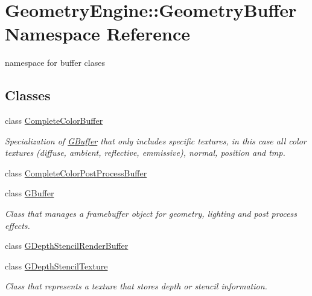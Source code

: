 \hypertarget{namespace_geometry_engine_1_1_geometry_buffer}{}\section{Geometry\+Engine\+::Geometry\+Buffer Namespace Reference}
\label{namespace_geometry_engine_1_1_geometry_buffer}


namespace for buffer clases  


\subsection*{Classes}
\begin{DoxyCompactItemize}
\item 
class \mbox{\hyperlink{class_geometry_engine_1_1_geometry_buffer_1_1_complete_color_buffer}{Complete\+Color\+Buffer}}
\begin{DoxyCompactList}\small\item\em Specialization of \mbox{\hyperlink{class_geometry_engine_1_1_geometry_buffer_1_1_g_buffer}{G\+Buffer}} that only includes specific textures, in this case all color textures (diffuse, ambient, reflective, emmissive), normal, position and tmp. \end{DoxyCompactList}\item 
class \mbox{\hyperlink{class_geometry_engine_1_1_geometry_buffer_1_1_complete_color_post_process_buffer}{Complete\+Color\+Post\+Process\+Buffer}}
\item 
class \mbox{\hyperlink{class_geometry_engine_1_1_geometry_buffer_1_1_g_buffer}{G\+Buffer}}
\begin{DoxyCompactList}\small\item\em Class that manages a framebuffer object for geometry, lighting and post process effects. \end{DoxyCompactList}\item 
class \mbox{\hyperlink{class_geometry_engine_1_1_geometry_buffer_1_1_g_depth_stencil_render_buffer}{G\+Depth\+Stencil\+Render\+Buffer}}
\item 
class \mbox{\hyperlink{class_geometry_engine_1_1_geometry_buffer_1_1_g_depth_stencil_texture}{G\+Depth\+Stencil\+Texture}}
\begin{DoxyCompactList}\small\item\em Class that represents a texture that stores depth or stencil information. \end{DoxyCompactList}\item 

\end{DoxyCompactItemize}
